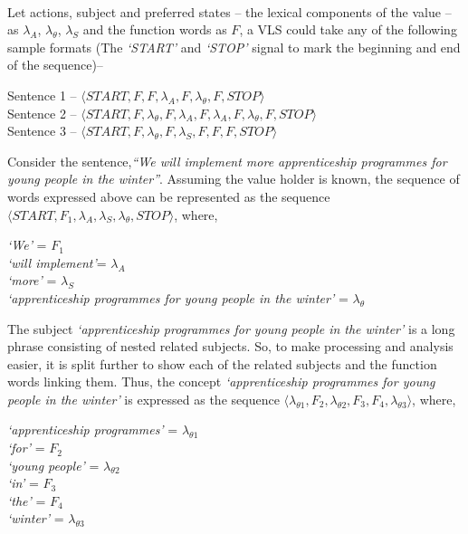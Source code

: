 \paragraph{} 
Let actions, subject and preferred states -- the lexical components of the value -- as $\lambda_A$, $\lambda_\theta$, $\lambda_S$ and the function words as $F$, a VLS could take any of the following sample formats (The \emph{`START'} and \emph{`STOP'} signal to mark the beginning and end of the sequence)--
\begin{center}
Sentence 1 -- $\langle START,F,F,\lambda_A,F,\lambda_\theta,F,STOP \rangle$\\
Sentence 2 -- $\langle START,F,\lambda_\theta,F,\lambda_A,F,\lambda_A,F,\lambda_\theta,F,STOP \rangle$\\
Sentence 3 -- $\langle START,F,\lambda_\theta,F,\lambda_S,F,F,F,STOP \rangle$ \\
\end{center}

Consider the sentence,\emph{``We will implement more apprenticeship programmes for young people in the winter''}. Assuming the value holder is known, the sequence of words expressed above can be represented as the sequence $\langle START,F_1,\lambda_A,\lambda_S,\lambda_\theta,STOP \rangle$, where, 
\begin{center}

\emph{`We'} = $F_1$\\
\emph{`will implement'}= $\lambda_A$\\
\emph{`more'} = $\lambda_S$\\
\emph{`apprenticeship programmes for young people in the winter'} = $\lambda_\theta$\\

\end{center}

The subject \emph{`apprenticeship programmes for young people in the winter'} is a long phrase consisting of nested related subjects. So, to make processing and analysis easier, it is split further to show each of the related subjects and the function words linking them. Thus, the concept \emph{`apprenticeship programmes for young people in the winter'} is expressed as the sequence $\langle \lambda_{\theta1},F_2,\lambda_{\theta2},F_3,F_4,\lambda_{\theta3} \rangle$, where,
\begin{center}

\emph{`apprenticeship programmes'} = $\lambda_{\theta1}$\\
\emph{`for'} = $F_2$\\
\emph{`young people'} = $\lambda_{\theta2}$\\
\emph{`in'} = $F_3$\\
\emph{`the'} = $F_4$\\
\emph{`winter'} = $\lambda_{\theta3}$

\end{center}

